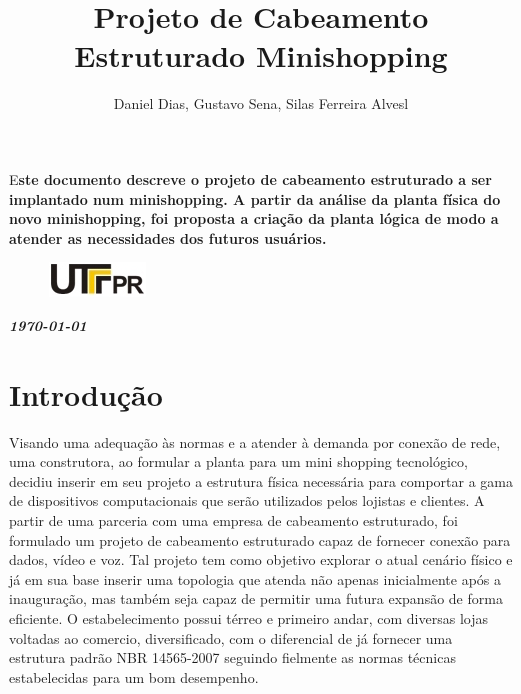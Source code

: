\documentclass[	DIV=calc,%
							paper=a4,%
							fontsize=12pt,%
							onecolumn]{scrartcl}	 					%
\title{Projeto de Cabeamento Estruturado Minishopping}					%
\author{Daniel Dias, Gustavo Sena, Silas Ferreira Alvesl }  	%
\date{}																				%
\newcommand{\initial}[1]{%
     \lettrine[lines=3,lhang=0.3,nindent=0em]{
     				\color{DarkGoldenrod}
     				{\textsf{#1}}}{}}
\begin{document}
\maketitle
\thispagestyle{fancy} 	
\thispagestyle{empty}		%




\initial{E}\textbf{ste documento descreve o projeto de cabeamento estruturado a ser implantado num minishopping. 
A partir da análise da planta física do novo minishopping, foi proposta  a criação da planta lógica de modo a atender as necessidades dos futuros usuários.}
\begin{figure}
	\centering
	\includegraphics{utfpr}
\end{figure}

\vspace{3cm}
\centerline{\textit{\textbf{\today}}}

\clearpage
    \renewcommand*\listfigurename{Lista de figuras}
\listoffigures

\renewcommand*\listtablename{Lista de tabelas}
\listoftables




\clearpage
\renewcommand{\contentsname}{Sumário}
\tableofcontents
\clearpage

\section{Introdução}
Visando uma adequação às normas e a atender à demanda por conexão de rede, uma construtora, ao formular a planta para um  mini shopping tecnológico, decidiu inserir em seu projeto a estrutura física necessária para comportar a gama de dispositivos computacionais que serão utilizados pelos lojistas e clientes.
A partir de uma parceria com uma empresa de cabeamento estruturado, foi formulado um projeto de cabeamento estruturado capaz de fornecer conexão para dados, vídeo e voz.
Tal projeto tem como objetivo explorar o atual cenário físico e já em sua base inserir uma topologia que atenda não apenas inicialmente após a inauguração, mas também seja capaz de permitir uma futura expansão de forma eficiente.
O estabelecimento possui térreo e primeiro andar, com diversas lojas voltadas ao comercio, diversificado, com o diferencial de já fornecer uma estrutura padrão NBR 14565-2007 seguindo fielmente as normas técnicas estabelecidas para um bom desempenho.
\end{document}
